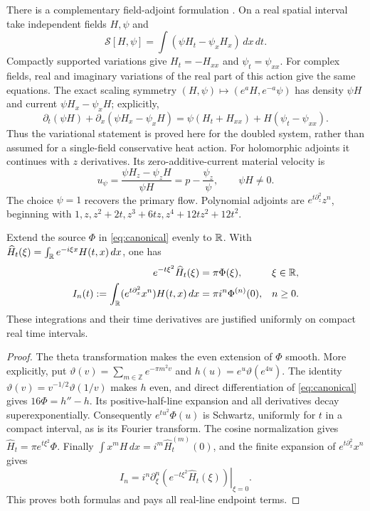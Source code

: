 There is a complementary field-adjoint formulation
\cite{noether,ibragimov2007,anco}.  On a real spatial interval take
independent fields $H,\psi$ and
\begin{equation}
 \mathcal S[H,\psi]=\int(\psi H_t-\psi_xH_x)\,dx\,dt.
 \label{eq:cc-adjoint-action}
\end{equation}
Compactly supported variations give $H_t=-H_{xx}$ and
$\psi_t=\psi_{xx}$.  For complex fields, real and imaginary variations
of the real part of this action give the same equations.  The exact
scaling symmetry $(H,\psi)\mapsto(e^aH,e^{-a}\psi)$ has density
$\psi H$ and current $\psi H_x-\psi_xH$; explicitly,
\begin{equation}
 \partial_t(\psi H)+\partial_x(\psi H_x-\psi_xH)
 =\psi(H_t+H_{xx})+H(\psi_t-\psi_{xx}).
 \label{eq:cc-adjoint-identity}
\end{equation}
Thus the variational statement is proved here for the doubled system,
rather than assumed for a single-field conservative heat action.
For holomorphic adjoints it continues with $z$ derivatives.  Its
zero-additive-current material velocity is
\begin{equation}
 u_\psi=\frac{\psi H_z-\psi_zH}{\psi H}
 =p-\frac{\psi_z}{\psi},
 \qquad \psi H\ne0.
 \label{eq:cc-adjoint-velocity}
\end{equation}
The choice $\psi=1$ recovers the primary flow.  Polynomial adjoints are
$e^{t\partial_z^2}z^n$, beginning with
$1,z,z^2+2t,z^3+6tz,z^4+12tz^2+12t^2$.

\begin{proposition}
\label{prop:cc-hierarchy}
Extend the source $\Phi$ in \eqref{eq:canonical} evenly to $\mathbb R$.
With $\widehat H_t(\xi)=\int_\mathbb R e^{-i\xi x}H(t,x)\,dx$, one has
\begin{align}
 e^{-t\xi^2}\widehat H_t(\xi)&=\pi\Phi(\xi),
 &&\xi\in\mathbb R,\label{eq:cc-fourier}\\
 I_n(t):=\int_\mathbb R(e^{t\partial_x^2}x^n)H(t,x)\,dx
 &=\pi i^n\Phi^{(n)}(0),
 &&n\ge0.\label{eq:cc-polynomial-invariants}
\end{align}
These integrations and their time derivatives are justified uniformly
on compact real time intervals.
\end{proposition}
\begin{proof}
The theta transformation makes the even extension of $\Phi$ smooth.
More explicitly, put
$\vartheta(v)=\sum_{m\in\mathbb Z}e^{-\pi m^2v}$ and
$h(u)=e^u\vartheta(e^{4u})$.
The identity $\vartheta(v)=v^{-1/2}\vartheta(1/v)$ makes $h$ even,
and direct differentiation of \eqref{eq:canonical} gives
$16\Phi=h''-h$.  Its positive-half-line expansion and all derivatives
decay superexponentially.  Consequently $e^{tu^2}\Phi(u)$ is Schwartz,
uniformly for $t$ in a compact interval, as is its Fourier transform.
The cosine normalization gives
$\widehat H_t=\pi e^{t\xi^2}\Phi$.
Finally $\int x^mH\,dx=i^m\widehat H_t^{(m)}(0)$, and the finite
expansion of $e^{t\partial_x^2}x^n$ gives
\[
 I_n=i^n\left.\partial_\xi^n
       (e^{-t\xi^2}\widehat H_t(\xi))\right|_{\xi=0}.
\]
This proves both formulas and pays all real-line endpoint terms.
\end{proof}

